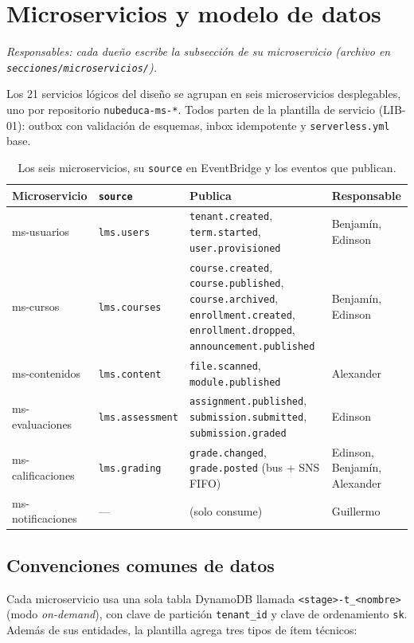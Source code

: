 \section{Microservicios y modelo de datos}
\label{sec:microservicios}
\textit{Responsables: cada dueño escribe la subsección de su microservicio
(archivo en \texttt{secciones/microservicios/}).}

Los 21 servicios lógicos del diseño se agrupan en seis microservicios desplegables, uno por
repositorio \texttt{nubeduca-ms-*}. Todos parten de la plantilla de servicio (LIB-01): outbox con
validación de esquemas, inbox idempotente y \texttt{serverless.yml} base.

\begin{table}[htbp]
\centering\small
\begin{tabularx}{\textwidth}{p{}p{}Xp{}}
\toprule
Microservicio & \texttt{source} & Publica & Responsable \\
\midrule
ms-usuarios & \texttt{lms.users} & \texttt{tenant.created}, \texttt{term.started}, \texttt{user.provisioned} & Benjamín, Edinson \\
ms-cursos & \texttt{lms.courses} & \texttt{course.created}, \texttt{course.published}, \texttt{course.archived}, \texttt{enrollment.created}, \texttt{enrollment.dropped}, \texttt{announcement.published} & Benjamín, Edinson \\
ms-contenidos & \texttt{lms.content} & \texttt{file.scanned}, \texttt{module.published} & Alexander \\
ms-evaluaciones & \texttt{lms.assessment} & \texttt{assignment.published}, \texttt{submission.submitted}, \texttt{submission.graded} & Edinson \\
ms-calificaciones & \texttt{lms.grading} & \texttt{grade.changed}, \texttt{grade.posted} (bus + SNS FIFO) & Edinson, Benjamín, Alexander \\
ms-notificaciones & --- & (solo consume) & Guillermo \\
\bottomrule
\end{tabularx}
\caption{Los seis microservicios, su \texttt{source} en EventBridge y los eventos que publican.}
\label{tab:microservicios}
\end{table}

\subsection{Convenciones comunes de datos}
Cada microservicio usa una sola tabla DynamoDB llamada \texttt{<stage>-t\_<nombre>} (modo
\textit{on-demand}), con clave de partición \texttt{tenant\_id} y clave de ordenamiento \texttt{sk}.
Además de sus entidades, la plantilla agrega tres tipos de ítem técnicos:

